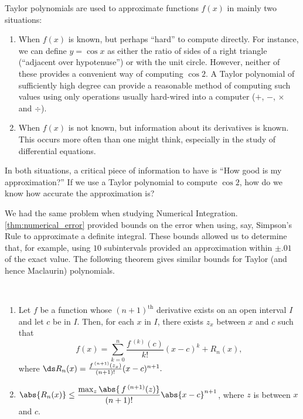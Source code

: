 Taylor polynomials are used to approximate functions $f(x)$ in mainly two situations:
\begin{enumerate}
	\item	When $f(x)$ is known, but perhaps ``hard'' to compute directly. For instance, we can define $y=\cos x$ as either the ratio of sides of a right triangle (``adjacent over hypotenuse'') or with the unit circle. However, neither of these provides a convenient way of computing $\cos 2$. A Taylor polynomial of sufficiently high degree can provide a reasonable method of computing such values using only operations usually hard-wired into a computer ($+$, $-$, $\times$ and $\div$).
	
	\item	When $f(x)$ is not known, but information about its derivatives is known. This occurs more often than one might think, especially in the study of differential equations.
\end{enumerate}

	
In both situations, a critical piece of information to have is ``How good is my approximation?'' If we use a Taylor polynomial to compute $\cos 2$, how do we know how accurate the approximation is? 

We had the same problem when studying Numerical Integration. \autoref{thm:numerical_error} provided bounds on the error when using, say, Simpson's Rule to approximate a definite integral. These bounds allowed us to determine that, for example, using $10$ subintervals provided an approximation within $\pm .01$ of the exact value. The following theorem gives similar bounds for Taylor (and hence Maclaurin) polynomials.

\begin{theorem}\label{thm:taylorthm}
\mbox{}\\[-2\baselineskip]
\begin{enumerate}
	\item	Let $f$ be a function whose $(n+1)^{\text{th}}$ derivative exists on an open interval $I$ and let $c$ be in $I$. Then, for each $x$ in $I$, there exists $z_x$ between $x$ and $c$ such that
\[f(x) = \sum_{k=0}^n\frac{f\,^{(k)}(c)}{k!}(x-c)^k+R_n(x),\]
where $\ds R_n(x) = \frac{f\,^{(n+1)}(z_x)}{(n+1)!}(x-c)^{n+1}.$
	\item	$\abs{R_n(x)}\leq\dfrac{\max_z\abs{\,f\,^{(n+1)}(z)}}{(n+1)!}\abs{x-c}^{n+1}$, where $z$ is between $x$ and $c$.
\end{enumerate}
\end{theorem}

